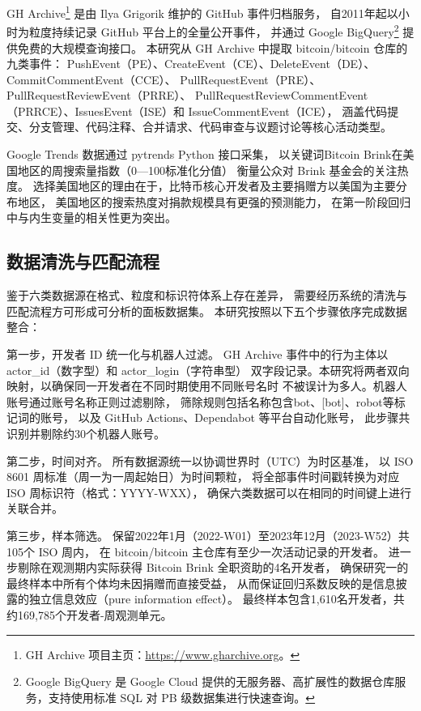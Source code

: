 \documentclass[
    type = master, %
    degree = professional,        %
    decl-page,  %
    twoside,                %
    fontset = fandol %
  ]{njuthesis}
\begin{document}
GH Archive\footnote{GH Archive 项目主页：\url{https://www.gharchive.org}。} 是由 Ilya Grigorik 维护的 GitHub 事件归档服务，
自2011年起以小时为粒度持续记录 GitHub 平台上的全量公开事件，
并通过 Google BigQuery\footnote{Google BigQuery 是 Google Cloud 提供的无服务器、高扩展性的数据仓库服务，支持使用标准 SQL 对 PB 级数据集进行快速查询。} 提供免费的大规模查询接口。
本研究从 GH Archive 中提取 bitcoin/bitcoin 仓库的九类事件：
PushEvent（PE）、CreateEvent（CE）、DeleteEvent（DE）、CommitCommentEvent（CCE）、
PullRequestEvent（PRE）、PullRequestReviewEvent（PRRE）、
PullRequestReviewCommentEvent（PRRCE）、IssuesEvent（ISE）和 IssueCommentEvent（ICE），
涵盖代码提交、分支管理、代码注释、合并请求、代码审查与议题讨论等核心活动类型。

Google Trends 数据通过 pytrends Python 接口采集，
以关键词Bitcoin Brink在美国地区的周搜索量指数（0—100标准化分值）
衡量公众对 Brink 基金会的关注热度。
选择美国地区的理由在于，比特币核心开发者及主要捐赠方以美国为主要分布地区，
美国地区的搜索热度对捐款规模具有更强的预测能力，
在第一阶段回归中与内生变量的相关性更为突出。

\subsection{数据清洗与匹配流程}

鉴于六类数据源在格式、粒度和标识符体系上存在差异，
需要经历系统的清洗与匹配流程方可形成可分析的面板数据集。
本研究按照以下五个步骤依序完成数据整合：

第一步，开发者 ID 统一化与机器人过滤。
GH Archive 事件中的行为主体以 actor\_id（数字型）和 actor\_login（字符串型）
双字段记录。本研究将两者双向映射，以确保同一开发者在不同时期使用不同账号名时
不被误计为多人。机器人账号通过账号名称正则过滤剔除，
筛除规则包括名称包含bot、[bot]、robot等标记词的账号，
以及 GitHub Actions、Dependabot 等平台自动化账号，
此步骤共识别并剔除约30个机器人账号。

第二步，时间对齐。
所有数据源统一以协调世界时（UTC）为时区基准，
以 ISO 8601 周标准（周一为一周起始日）为时间颗粒，
将全部事件时间戳转换为对应 ISO 周标识符（格式：YYYY-WXX），
确保六类数据可以在相同的时间键上进行关联合并。

第三步，样本筛选。
保留2022年1月（2022-W01）至2023年12月（2023-W52）共105个 ISO 周内，
在 bitcoin/bitcoin 主仓库有至少一次活动记录的开发者。
进一步剔除在观测期内实际获得 Bitcoin Brink 全职资助的4名开发者，
确保研究一的最终样本中所有个体均未因捐赠而直接受益，
从而保证回归系数反映的是信息披露的独立信息效应（pure information effect）。
最终样本包含1,610名开发者，共约169,785个开发者-周观测单元。
\end{document}
